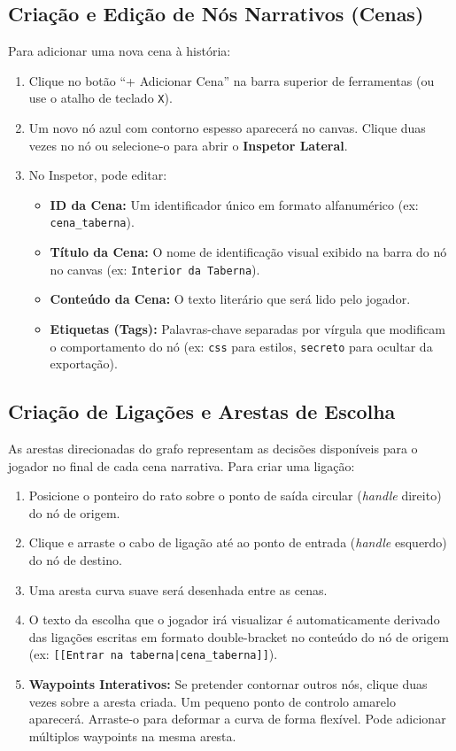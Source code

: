 \subsection{Criação e Edição de Nós Narrativos (Cenas)}
Para adicionar uma nova cena à história:
\begin{enumerate}
    \item Clique no botão ``+ Adicionar Cena'' na barra superior de ferramentas (ou use o atalho de teclado \texttt{X}).
    \item Um novo nó azul com contorno espesso aparecerá no canvas. Clique duas vezes no nó ou selecione-o para abrir o \textbf{Inspetor Lateral}.
    \item No Inspetor, pode editar:
    \begin{itemize}
        \item \textbf{ID da Cena:} Um identificador único em formato alfanumérico (ex: \texttt{cena\_taberna}).
        \item \textbf{Título da Cena:} O nome de identificação visual exibido na barra do nó no canvas (ex: \texttt{Interior da Taberna}).
        \item \textbf{Conteúdo da Cena:} O texto literário que será lido pelo jogador.
        \item \textbf{Etiquetas (Tags):} Palavras-chave separadas por vírgula que modificam o comportamento do nó (ex: \texttt{css} para estilos, \texttt{secreto} para ocultar da exportação).
    \end{itemize}
\end{enumerate}

\subsection{Criação de Ligações e Arestas de Escolha}
As arestas direcionadas do grafo representam as decisões disponíveis para o jogador no final de cada cena narrativa. Para criar uma ligação:
\begin{enumerate}
    \item Posicione o ponteiro do rato sobre o ponto de saída circular (\textit{handle} direito) do nó de origem.
    \item Clique e arraste o cabo de ligação até ao ponto de entrada (\textit{handle} esquerdo) do nó de destino.
    \item Uma aresta curva suave será desenhada entre as cenas.
    \item O texto da escolha que o jogador irá visualizar é automaticamente derivado das ligações escritas em formato double-bracket no conteúdo do nó de origem (ex: \texttt{[[Entrar na taberna|cena\_taberna]]}).
    \item \textbf{Waypoints Interativos:} Se pretender contornar outros nós, clique duas vezes sobre a aresta criada. Um pequeno ponto de controlo amarelo aparecerá. Arraste-o para deformar a curva de forma flexível. Pode adicionar múltiplos waypoints na mesma aresta.
\end{enumerate}


